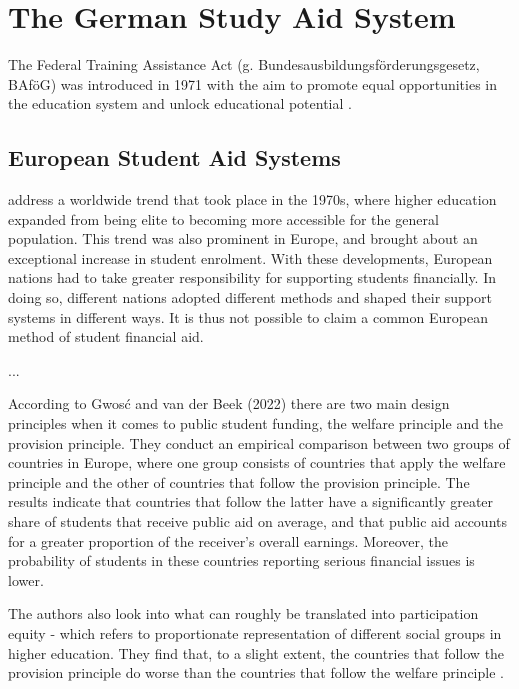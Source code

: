 \section{The German Study Aid System} 
\label{section:the-german-study-aid-system}

The Federal Training Assistance Act (g. Bundesausbildungsförderungsgesetz, BAföG) was introduced in 1971 with the aim to promote equal opportunities in the education system and unlock educational potential \citep{meier_bafog_2024}.

\subsection{European Student Aid Systems } \label{subsection:european-student-aid-systems} 
\cite{schwarz_study_2004} address a worldwide trend that took place in the 1970s, where higher education expanded from being elite to becoming more accessible for the general population. This trend was also prominent in Europe, and brought about an exceptional increase in student enrolment. With these developments, European nations had to take greater responsibility for supporting students financially. In doing so, different nations adopted different methods and shaped their support systems in different ways. It is thus not possible to claim a common European method of student financial aid.

...

According to Gwosć and van der Beek (2022) there are two main design principles when it comes to public student funding, the welfare principle and the provision principle. They conduct an empirical comparison between two groups of countries in Europe, where one group consists of countries that apply the welfare principle and the other of countries that follow the provision principle. The results indicate that countries that follow the latter have a significantly greater share of students that receive public aid on average, and that public aid accounts for a greater proportion of the receiver’s overall earnings. Moreover, the probability of students in these countries reporting serious financial issues is lower.

The authors also look into what can roughly be translated into participation equity - which refers to proportionate representation of different social groups in higher education. They find that, to a slight extent, the countries that follow the provision principle do worse than the countries that follow the welfare principle \citep{gwosc_krisenbewaltigung_2022}.

